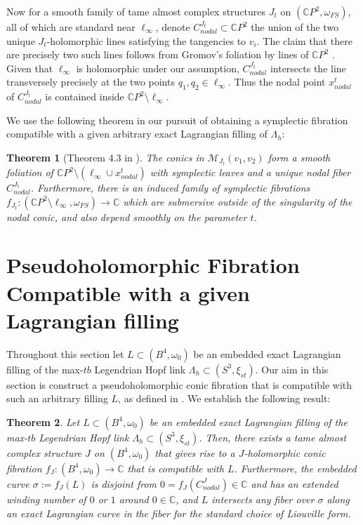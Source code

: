 \documentclass[10pt]{amsart}
\theoremstyle{plain}
\newtheorem{thm}{Theorem}[section]
\theoremstyle{definition}
\numberwithin{equation}{section}
\newcommand{\C}{\mathbb{C}}
\newcommand{\La}{\Lambda}
\newcommand{\sse}{\subset}
\newcommand{\sm}{\setminus}
\begin{document}
Now for a smooth family of tame almost complex structures $J_t$ on $(\C P^2,\omega_{FS})$, all of which are standard near $\ell_\infty$, denote $C_{nodal}^{J_t}\sse \C P^2$ the union of the two unique $J_t$-holomorphic lines satisfying the tangencies to $v_i$. The claim that there are precisely two such lines follows from Gromov's foliation by lines of $\C P^2$ \cite{Gromov85_PseudoholCurves}. Given that $\ell_\infty$ is holomorphic under our assumption, $C_{nodal}^{J_t}$ intersects the line transversely precisely at the two points $q_1,q_2\in \ell_\infty$. Thus the nodal point $x_{nodal}^t$ of $C_{nodal}^{J_t}$ is contained inside $\C P^2\sm \ell_\infty$.

We use the following theorem in our pursuit of obtaining a symplectic fibration compatible with a given arbitrary exact Lagrangian filling of $\La_h$:

\begin{thm}[Theorem 4.3 in \cite{DR19_WhitneySphere}]\label{thm:DRfibr} The conics in $\mathcal{M}_{J_t}(v_1,v_2)$ form a smooth foliation of $\C P^2\sm (\ell_\infty \cup x_{nodal}^t)$ with symplectic leaves and a unique nodal fiber $C_{nodal}^{J_t}$. Furthermore, there is an induced family of symplectic fibrations $f_{J_t}: (\C P^2\sm \ell_\infty,\omega_{FS})\to \C$ which are submersive outside of the singularity of the nodal conic, and also depend smoothly on the parameter $t$.
\end{thm}

\section{Pseudoholomorphic Fibration Compatible with a given Lagrangian filling}\label{sec:fibration}

Throughout this section let $L\sse (B^4,\omega_{0})$ be an embedded exact Lagrangian filling of the max-$tb$ Legendrian Hopf link $\La_h\sse(S^3,\xi_{st})$. Our aim in this section is construct a pseudoholomorphic conic fibration that is compatible with such an arbitrary filling $L$, as defined in  . We establish the following result:

\begin{thm}\label{lem:compmain}
Let $L\sse (B^4,\omega_{0})$ be an embedded exact Lagrangian filling of the max-$tb$ Legendrian Hopf link $\La_h\sse(S^3,\xi_{st})$. Then, there exists a tame almost complex structure $J$ on $(B^4,\omega_{0})$ that gives rise to a $J$-holomorphic conic fibration $f_J:(B^4,\omega_{0})\to \C$ that is compatible with $L$. Furthermore, the embedded curve $\sigma:=f_J(L)$ is disjoint from $0=f_J(C_{nodal}^J)\in \C$ and has an extended winding number of $0$ or $1$ around $0\in \C$, and $L$ intersects any fiber over $\sigma$ along an exact Lagrangian curve in the fiber for the standard choice of Liouville form. 
\end{thm}
\end{document}
